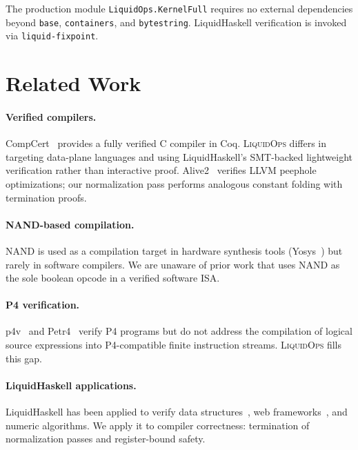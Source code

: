 \documentclass[sigconf,natbib=false]{acmart}
\begin{document}
The production module \texttt{LiquidOps.KernelFull} requires no external
dependencies beyond \texttt{base}, \texttt{containers}, and \texttt{bytestring}.
LiquidHaskell verification is invoked via \texttt{liquid-fixpoint}.


\section{Related Work}

\paragraph{Verified compilers.}
CompCert~\cite{leroy2009compcert} provides a fully verified C compiler in Coq.
\textsc{LiquidOps} differs in targeting data-plane languages and using
LiquidHaskell's SMT-backed lightweight verification rather than interactive
proof. Alive2~\cite{lopes2021alive2} verifies LLVM peephole optimizations;
our normalization pass performs analogous constant folding with termination proofs.

\paragraph{NAND-based compilation.}
NAND is used as a compilation target in hardware synthesis tools
(Yosys~\cite{wolf2013yosys}) but rarely in software compilers. We are unaware
of prior work that uses NAND as the sole boolean opcode in a verified software ISA.

\paragraph{P4 verification.}
p4v~\cite{liu2018p4v} and Petr4~\cite{petr4} verify P4 programs but do not
address the compilation of logical source expressions into P4-compatible
finite instruction streams. \textsc{LiquidOps} fills this gap.

\paragraph{LiquidHaskell applications.}
LiquidHaskell has been applied to verify data structures~\cite{vazou2016refinement},
web frameworks~\cite{vazou2018safe}, and numeric algorithms. We apply it to
compiler correctness: termination of normalization passes and register-bound
safety.
\end{document}
